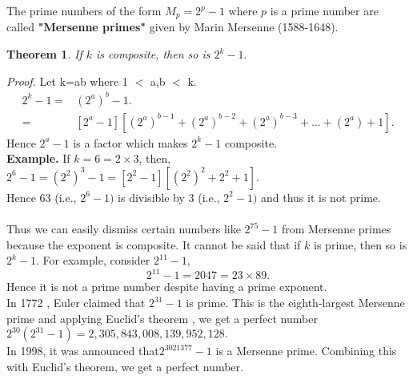 \documentclass[a4paper,reqno,11pt]{book}
\theoremstyle{plain}%
\newtheorem{thm}{Theorem}[chapter]
\theoremstyle{definition}
\begin{document}
The prime numbers of the form $M_{p} = 2^p - 1$ where $p$ is a prime number are called \textbf{"Mersenne primes"} given by Marin
Mersenne (1588-1648). \\
\begin{thm}\label{thm:Type 1} If $k$ is composite, then so is $2^k - 1.$\\ 
\end{thm} \textit{Proof.}  Let k=ab where 1 $<$ a,b $<$ k.
\begin{align*}
2^k - 1 =& (2^a)^b - 1.\\
=& [2^a-1] [(2^a)^{b-1} + (2^a)^{b-2} + (2^a)^{b-3} + ... + (2^a) + 1].
\end{align*}
Hence $ 2^
a - 1$ is  a factor which makes $2^k-1$ composite.\\\textbf{Example.} If $k = 6 = 2 \times 3$, then,\\
$2^
6 - 1 = (2^2
)^
3 -1 = [2^2 -1][(2^2
)^
2 + 2^
2 + 1].$ \\
Hence 63 (i.e., $2^
6 - 1)$ is divisible by 3 (i.e., $2^
2 - 1)$ and thus it is not prime.\\
\\
Thus we can easily dismiss certain numbers like $2^
{75} - 1$ from 
 Mersenne primes because the exponent is composite. 
It cannot be said that if $k$ is 
prime, then so is $ 2^
k - 1. $ For example, consider $2^
{11} - 1,$ \\
$$2^
{11} - 1 = 2047 = 23 \times 89. $$
Hence it is not a prime number despite having a prime exponent.\\
 In  1772 ,
 Euler claimed that $2^
{31} -1$ is prime.\cite{ref 1}
This is the eighth-largest Mersenne prime and applying Euclid's theorem ,
we get a perfect number
$2^
{30}
(2^{31} - 1) = 2,305,843,008,139,952,128. $\\
In 1998, it was announced that$ 2^
{3021377} - 1$ is a Mersenne prime. Combining this with Euclid's theorem, we get a perfect number.
 
\end{document}
